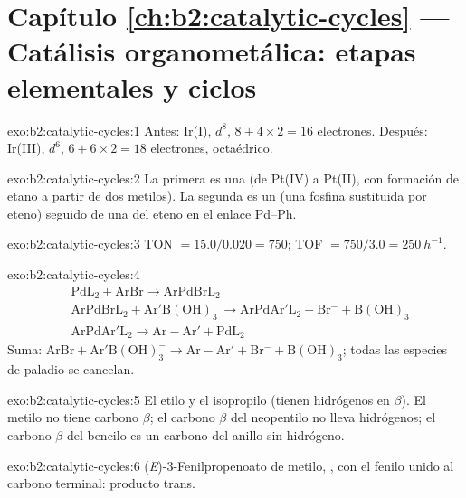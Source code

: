 \section*{Capítulo \ref{ch:b2:catalytic-cycles} --- Catálisis organometálica: etapas elementales y ciclos}

\begin{solution}{exo:b2:catalytic-cycles:1}
Antes: Ir(I), $d^8$, $8 + 4 \times 2 = 16$ electrones. Después: Ir(III), $d^6$, $6 + 6 \times 2 = 18$
electrones, octaédrico.
\end{solution}

\begin{solution}{exo:b2:catalytic-cycles:2}
La primera es una  (de Pt(IV) a Pt(II), con formación de etano a partir de dos metilos).
La segunda es un  (una fosfina sustituida por eteno) seguido de una
 del eteno en el enlace Pd--Ph.
\end{solution}

\begin{solution}{exo:b2:catalytic-cycles:3}
TON $= 15.0/0.020 = 750$; TOF $= 750/3.0 = \qty{250}{h^{-1}}$.
\end{solution}

\begin{solution}{exo:b2:catalytic-cycles:4}
\begin{align*}
  &\mathrm{PdL_2 + ArBr \to ArPdBrL_2}\\
  &\mathrm{ArPdBrL_2 + Ar'B(OH)_3^- \to ArPdAr'L_2 + Br^- + B(OH)_3}\\
  &\mathrm{ArPdAr'L_2 \to Ar{-}Ar' + PdL_2}
\end{align*}
Suma: $\mathrm{ArBr + Ar'B(OH)_3^- \to Ar{-}Ar' + Br^- + B(OH)_3}$; todas las especies de paladio
se cancelan.
\end{solution}

\begin{solution}{exo:b2:catalytic-cycles:5}
El etilo y el isopropilo (tienen hidrógenos en $\beta$). El metilo no tiene carbono $\beta$; el carbono $\beta$
del neopentilo no lleva hidrógenos; el carbono $\beta$ del bencilo es un carbono  del anillo sin
hidrógeno.
\end{solution}

\begin{solution}{exo:b2:catalytic-cycles:6}
(\textit{E})-3-Fenilpropenoato de metilo, , con el fenilo unido al
carbono terminal: producto trans.
\end{solution}

